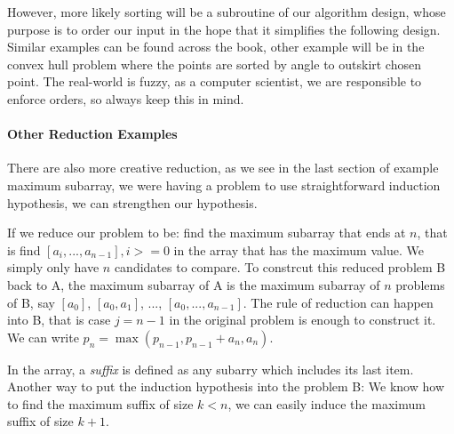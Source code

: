 \documentclass[../main.tex]{subfiles}
\begin{document}
However, more likely sorting will be a subroutine of our algorithm design, whose purpose is to order our input in the hope that it simplifies the following design. Similar examples can be found across the book, other example will be in the convex hull problem where the points are sorted by angle to outskirt chosen point. The real-world is fuzzy, as a computer scientist, we are responsible to enforce orders, so always keep this in mind. 

\paragraph{Other Reduction Examples}

There are also more creative reduction,  as we see in the last section of example maximum subarray, we were having a problem to use straightforward induction hypothesis, we can strengthen our hypothesis.

If we reduce our problem to be: find the maximum subarray that ends at $n$, that is find $[a_i,...,a_{n-1}], i>=0$ in the array that has the maximum value. We simply only have $n$ candidates to compare. To constrcut this reduced problem B back to A, the maximum subarray of A is the maximum subarray of $n$ problems of B, say $[a_0]$, $[a_0, a_1]$, ..., $[a_0,...,a_{n-1}]$. The rule of reduction can happen into B, that is case $j=n-1$ in the original problem is enough to construct it. We can write $p_n=\max(p_{n-1}, p_{n-1}+a_n, a_n)$. 

In the array, a \textit{suffix} is defined as any subarry which includes its last item. Another way to put the induction hypothesis into the problem B: We know how to find the maximum suffix of size $k<n$, we can easily induce the maximum suffix of size $k+1$.
\end{document}
